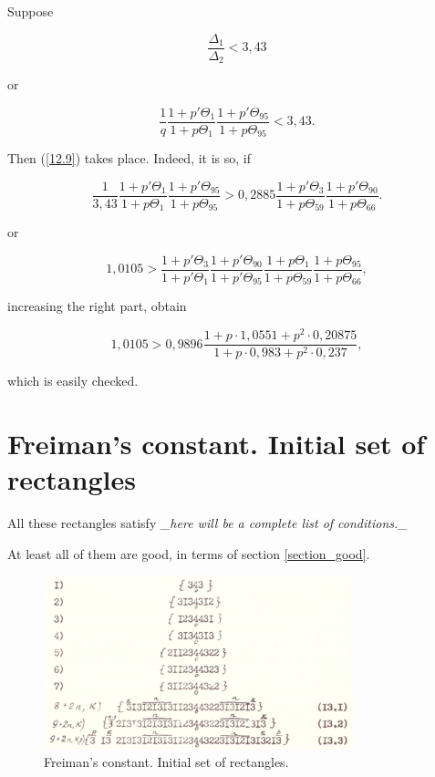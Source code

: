 \documentclass[a4paper, 12pt]{article}
\let\oldref\ref
\renewcommand{\ref}[1]{(\oldref{#1})}
\theoremstyle{definition}
\theoremstyle{definition}
\theoremstyle{proposition}
\theoremstyle{lemma}
\newcommand{\D}{\Delta}
\newcommand{\T}{\Theta}
\begin{document}
Suppose

\begin{equation}\tag{12.10}\label{goodness_condition_3,43}
	\dfrac{\D_1}{\D_2} < 3,43
\end{equation}

or

\begin{equation*}
	\dfrac{1}{q}
	\dfrac{1 + p' \T_{1}}{1 + p \T_{1}}
	\dfrac{1 + p' \T_{95}}{1 + p \T_{95}}
	<
	3,43.
\end{equation*}

Then \ref{12.9} takes place. Indeed, it is so, if

\begin{equation*}
	\dfrac{1}{3,43}
	\dfrac{1 + p' \T_{1}}{1 + p \T_{1}}
	\dfrac{1 + p' \T_{95}}{1 + p \T_{95}}
	>
	0,2885
	\dfrac{1 + p' \T_{3}}{1 + p \T_{59}}
	\dfrac{1 + p' \T_{90}}{1 + p \T_{66}}.
\end{equation*}

or

\begin{equation*}
	1,0105
	>
	\dfrac{1 + p' \T_{3}}{1 + p' \T_{1}}
	\dfrac{1 + p' \T_{90}}{1 + p' \T_{95}}
	\dfrac{1 + p \T_{1}}{1 + p \T_{59}}
	\dfrac{1 + p \T_{95}}{1 + p \T_{66}},
\end{equation*}

increasing the right part, obtain

\begin{equation*}
	1,0105
	>
	0,9896
	\dfrac
	{1 + p \cdot 1,0551 + p^2 \cdot 0,20875}
	{1 + p \cdot 0,983 + p^2 \cdot 0,237},
\end{equation*}

which is easily checked.

\newpage
\section{Freiman's constant. Initial set of rectangles}

All these rectangles satisfy \textit{\_here will be a complete list of conditions.\_}

At least all of them are good, in terms of section \oldref{section_good}.


\begin{figure}[H]
	\centering
	\includegraphics[width=0.8\textwidth]{initial_set}
	\caption{Freiman's constant. Initial set of rectangles.}
	\label{fc_init}
\end{figure}

%

\newpage
\tableofcontents
	
\end{document}
